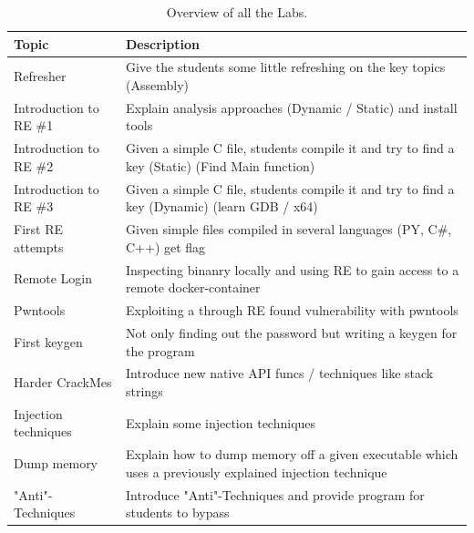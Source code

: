 \begin{center}
    \begin{table}[H]
        \centering
        \begin{tabular}{ |p{4.1cm}|p{10cm}| } 
            \hline
                Topic & 
                Description \\ [0.5ex] 
            \hline
            \hline
                Refresher & 
                Give the students some little refreshing on the key topics (Assembly)  \\ 
            \hline
                Introduction to RE \#1 & 
                Explain analysis approaches (Dynamic / Static) and install tools \\ 
            \hline
                Introduction to RE \#2 & 
                Given a simple C file, students compile it and try to find a key (Static) (Find Main function) \\ 
            \hline
                Introduction to RE \#3 & 
                Given a simple C file, students compile it and try to find a key (Dynamic) (learn GDB / x64) \\ 
            \hline
                First RE attempts & 
                Given simple files compiled in several languages (PY, C\#, C++) get flag \\ 
            \hline
                Remote Login  & 
                Inspecting binanry locally and using RE to gain access to a remote docker-container \\
            \hline
                Pwntools & 
                Exploiting a through RE found vulnerability with pwntools \\
            \hline
                First keygen & 
                Not only finding out the password but writing a keygen for the program \\
            \hline
                Harder CrackMes & 
                Introduce new native API funcs / techniques like stack strings \\
            \hline
                Injection techniques & 
                Explain some injection techniques \\
            \hline
                Dump memory & 
                Explain how to dump memory off a given executable which uses a previously explained injection technique \\
            \hline
                "Anti"-Techniques & 
                Introduce "Anti"-Techniques and provide program for students to bypass \\
            \hline
        \end{tabular}
        \caption{Overview of all the Labs.}
    \end{table}
\end{center}